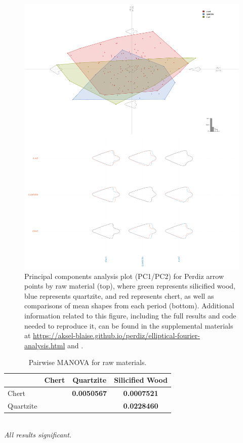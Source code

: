 \documentclass[review]{elsarticle}
\begin{document}
\begin{figure}[!]\centering
\includegraphics[width=\linewidth]{rawmat.pdf}
\caption{Principal components analysis plot (PC1/PC2) for Perdiz arrow points by raw material (top), where green represents silicified wood, blue represents quartzite, and red represents chert, as well as comparisons of mean shapes from each period (bottom). Additional information related to this figure, including the full results and code needed to reproduce it, can be found in the supplemental materials at \href{https://aksel-blaise.github.io/perdiz/elliptical-fourier-analysis.html}{https://aksel-blaise.github.io/perdiz/elliptical-fourier-analysis.html} and \citealp{RN8980}.}
\label{fig:gmrawmat}
\end{figure}

\begin{table}[tbh]\centering
\footnotesize
\caption{Pairwise MANOVA for raw materials.}
\centering
\begin{tabular}{lccc}
\hline
 & Chert & Quartzite & Silicified Wood\\
\hline
Chert & & \textbf{0.0050567} & \textbf{0.0007521}\\
Quartzite & & & \textbf{0.0228460}\\
\hline
\end{tabular}\\
\textit{All results significant.}
\label{tab:tab.shape.raw}
\end{table}
\end{document}
